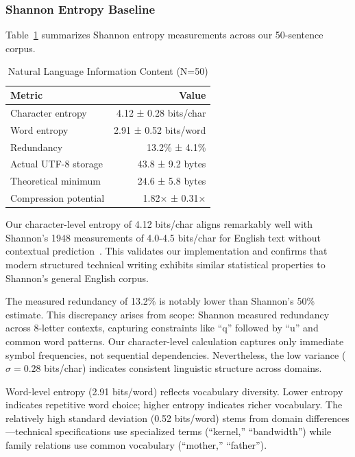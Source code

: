 \documentclass[conference]{IEEEtran}
\begin{document}
\subsubsection{Shannon Entropy Baseline}

Table~\ref{tab:shannon} summarizes Shannon entropy measurements across 
our 50-sentence corpus.

\begin{table}[t]
\centering
\caption{Natural Language Information Content (N=50)}
\label{tab:shannon}
\begin{tabular}{lr}
\toprule
\textbf{Metric} & \textbf{Value} \\
\midrule
Character entropy & 4.12 ± 0.28 bits/char \\
Word entropy & 2.91 ± 0.52 bits/word \\
Redundancy & 13.2\% ± 4.1\% \\
Actual UTF-8 storage & 43.8 ± 9.2 bytes \\
Theoretical minimum & 24.6 ± 5.8 bytes \\
Compression potential & 1.82× ± 0.31× \\
\bottomrule
\end{tabular}
\end{table}

Our character-level entropy of 4.12 bits/char aligns remarkably well 
with Shannon's 1948 measurements of 4.0-4.5 bits/char for English text 
without contextual prediction~\cite[p.~414]{Shannon1948}. This validates 
our implementation and confirms that modern structured technical writing 
exhibits similar statistical properties to Shannon's general English corpus.

The measured redundancy of 13.2\% is notably lower than Shannon's 50\% 
estimate. This discrepancy arises from scope: Shannon measured redundancy 
across 8-letter contexts, capturing constraints like ``q'' followed by 
``u'' and common word patterns. Our character-level calculation captures 
only immediate symbol frequencies, not sequential dependencies. Nevertheless, 
the low variance ($\sigma = 0.28$ bits/char) indicates consistent linguistic 
structure across domains.

Word-level entropy (2.91 bits/word) reflects vocabulary diversity. Lower 
entropy indicates repetitive word choice; higher entropy indicates richer 
vocabulary. The relatively high standard deviation (0.52 bits/word) stems 
from domain differences—technical specifications use specialized terms 
(``kernel,'' ``bandwidth'') while family relations use common vocabulary 
(``mother,'' ``father'').
\end{document}
